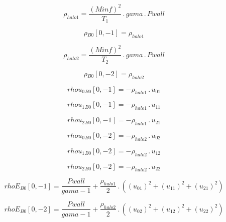 \documentclass{article}
\begin{document}
\begin{dmath}\rho_{halo 1} = \frac{\left(Minf \right)^{2}}{T_{1}} \,.\, gama \,.\, Pwall\end{dmath}

\begin{dmath}{\rho{_{B0}}}[{0,-1}] = \rho_{halo 1}\end{dmath}

\begin{dmath}\rho_{halo 2} = \frac{\left(Minf \right)^{2}}{T_{2}} \,.\, gama \,.\, Pwall\end{dmath}

\begin{dmath}{\rho{_{B0}}}[{0,-2}] = \rho_{halo 2}\end{dmath}

\begin{dmath}{rhou_{0}{_{B0}}}[{0,-1}] = - \rho_{halo 1} \,.\, u_{01}\end{dmath}

\begin{dmath}{rhou_{1}{_{B0}}}[{0,-1}] = - \rho_{halo 1} \,.\, u_{11}\end{dmath}

\begin{dmath}{rhou_{2}{_{B0}}}[{0,-1}] = - \rho_{halo 1} \,.\, u_{21}\end{dmath}

\begin{dmath}{rhou_{0}{_{B0}}}[{0,-2}] = - \rho_{halo 2} \,.\, u_{02}\end{dmath}

\begin{dmath}{rhou_{1}{_{B0}}}[{0,-2}] = - \rho_{halo 2} \,.\, u_{12}\end{dmath}

\begin{dmath}{rhou_{2}{_{B0}}}[{0,-2}] = - \rho_{halo 2} \,.\, u_{22}\end{dmath}

\begin{dmath}{rhoE{_{B0}}}[{0,-1}] = \frac{Pwall}{gama - 1} + \frac{\rho_{halo 1}}{2} \,.\, \left(\left(u_{01} \right)^{2} + \left(u_{11} \right)^{2} + \left(u_{21} \right)^{2}\right)\end{dmath}

\begin{dmath}{rhoE{_{B0}}}[{0,-2}] = \frac{Pwall}{gama - 1} + \frac{\rho_{halo 2}}{2} \,.\, \left(\left(u_{02} \right)^{2} + \left(u_{12} \right)^{2} + \left(u_{22} \right)^{2}\right)\end{dmath}
\end{document}
